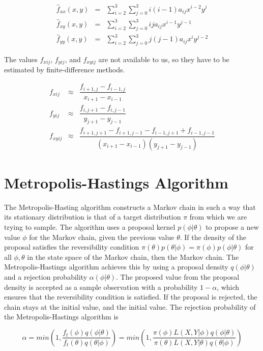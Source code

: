 $$
\begin{array}{rcl}
    \hat{f}_{xx}(x,y) & = & \sum_{i=2}^3 \sum_{j=0}^3 i (i-1) a_{ij}x^{i-2} y^j \\
    \hat{f}_{xy}(x,y) & = & \sum_{i=2}^3 \sum_{j=0}^3 i j a_{ij}x^{i-1} y^{j-1} \\
    \hat{f}_{yy}(x,y) & = & \sum_{i=2}^3 \sum_{j=0}^3 j (j-1) a_{ij}x^{i} y^{j-2}
\end{array}
$$

The values $f_{xij}$, $f_{yij}$, and $f_{xyij}$ are not available to us, so they have to be estimated by finite-difference methods. 


$$
\begin{array}{rcl}
    f_{xij} & \approx & \dfrac{f_{i+1,j} - f_{i-1,j}}{x_{i+1} - x_{i-1}}  \\
    f_{yij} & \approx & \dfrac{f_{i,j+1} - f_{i,j-1}}{y_{j+1} - y_{j-1}} \\
    f_{xyij} & \approx & \dfrac{f_{i+1,j+1} - f_{i+1,j-1} - f_{i-1,j+1} + f_{i-1,j-1}}{(x_{i+1} - x_{i-1})(y_{j+1} - y_{j-1})}
\end{array}
$$


\parencite{choudhary_bicubic_2018}

\section{Metropolis-Hastings Algorithm}


The Metropolis-Hasting algorithm constructs a Markov chain in such a way that its stationary distribution is that of a target distribution $\pi$ from which we are trying to sample. The algorithm uses a proposal kernel $p(\phi | \theta)$ to propose a new value $\phi$ for the Markov chain, given the previous value $\theta$. If the density of the proposal satisfies the reversibility condition $\pi(\theta) p(\theta|\phi) = \pi(\phi) p(\phi|\theta)$ for all $\phi,\theta$ in the state space of the Markov chain, then the Markov chain. The Metropolis-Hastings algorithm achieves this by using a proposal density $q(\phi|\theta)$ and a rejection probability $\alpha(\phi|\theta)$. The proposed value from the proposal density is accepted as a sample observation with a probability $1-\alpha$, which ensures that the reversibility condition is satisfied. If the proposal is rejected, the chain stays at the initial value, and the initial value. The rejection probability of the Metropolis-Hastings algorithm is

$$
    \alpha = min \left( 1, \frac{f_t(\phi)q(\phi|\theta)}{f_t(\theta)q(\theta|\phi)} \right) = min \left( 1, \frac{\pi(\phi)L(X,Y|\phi)q(\phi|\theta)}{\pi(\theta)L(X,Y|\theta)q(\theta|\phi)} \right)
$$

